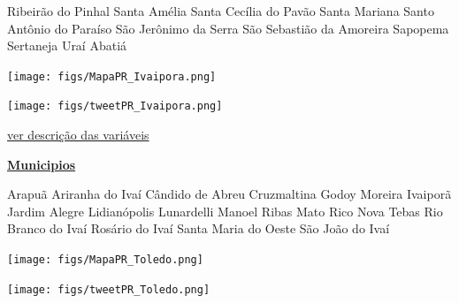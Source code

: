 \documentclass[10pt]{article} %
\begin{document}
\begin{minipage}[t]{.30\linewidth}
\begin{mdframed}[style=sidebar,frametitle={}]
\begin{itemize}
\gsquare Ribeirão do Pinhal 
\gsquare Santa Amélia 
\gsquare Santa Cecília do Pavão 
\gsquare Santa Mariana 
\gsquare Santo Antônio do Paraíso 
\gsquare São Jerônimo da Serra 
\gsquare São Sebastião da Amoreira 
\gsquare Sapopema 
\gsquare Sertaneja 
\gsquare Uraí 
\gsquare Abatiá 
\end{itemize}\BackToContents\end{mdframed}\hfill\end{minipage}\newpage\begin{minipage}[t]{.66\linewidth}
\hypertarget{Ivpr}{}
\texttt{[image: figs/MapaPR\_Ivaipora.png]}\vspace{0.5cm}\vspace{0.5cm}\begin{center}
\texttt{[image: figs/tweetPR\_Ivaipora.png]}\end{center}
\begin{center}

\end{center}
\small{\hyperlink{vartab}{ver descrição das variáveis}}\end{minipage}\hfill\begin{minipage}[t]{.30\linewidth}
\begin{mdframed}[style=sidebar,frametitle={}]
\textbf{\hyperlink{municips}{Municipios}}\begin{itemize}\gsquare Arapuã 
\gsquare Ariranha do Ivaí 
\gsquare Cândido de Abreu 
\gsquare Cruzmaltina 
\gsquare Godoy Moreira 
\gsquare Ivaiporã 
\gsquare Jardim Alegre 
\gsquare Lidianópolis 
\gsquare Lunardelli 
\gsquare Manoel Ribas 
\gsquare Mato Rico 
\gsquare Nova Tebas 
\gsquare Rio Branco do Ivaí 
\gsquare Rosário do Ivaí 
\gsquare Santa Maria do Oeste 
\gsquare São João do Ivaí 
\end{itemize}\BackToContents\end{mdframed}\hfill\end{minipage}\newpage\begin{minipage}[t]{.66\linewidth}
\hypertarget{Told}{}
\texttt{[image: figs/MapaPR\_Toledo.png]}\vspace{0.5cm}\vspace{0.5cm}\begin{center}
\texttt{[image: figs/tweetPR\_Toledo.png]}\end{center}

\end{minipage}
\end{document}
